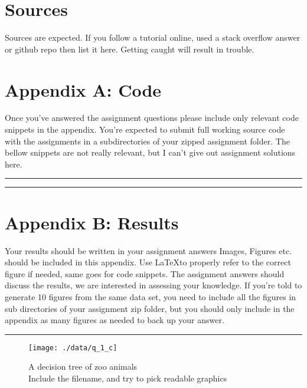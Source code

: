 \documentclass[	DIV=calc,%
				paper=a4,%
				fontsize=11pt,%
				twocolumn]{scrartcl}	 %
\newcommand{\HorRule}{\color{brsublue}%
					 \rule{\linewidth}{1pt}%
					 \color{black}
					 }
\begin{document}
\section*{Sources}
Sources are expected. If you follow a tutorial online, used a stack overflow answer or github repo then list it here. Getting caught will result in trouble.
\blindenumerate[3]

\newpage

\onecolumn
\section*{Appendix A: Code}

Once you've answered the assignment questions please include only relevant code snippets in the appendix. You're expected to submit full working source code with the assignments in a subdirectories of your zipped assignment folder. The bellow snippets are not really relevant, but I can't give out assignment solutions here. 

\HorRule



\HorRule



\newpage


\section*{Appendix B: Results}

Your results should be written in your assignment answers Images, Figures etc. should be included in this appendix. Use \LaTeX to properly refer to the correct figure if needed, same goes for code snippets. The assignment answers should discuss the results, we are interested in assessing your knowledge. If you're told to generate 10 figures from the same data set, you need to include all the figures in sub directories of your assignment zip folder, but you should only include in the appendix as many figures as needed to back up your answer. 

\HorRule

\begin{figure}[h]
  \centering
  \caption{A decision tree of zoo animals \\ Include the filename, and try to pick readable graphics}
  \texttt{[image: ./data/q\_1\_c]}
\end{figure}
\end{document}
